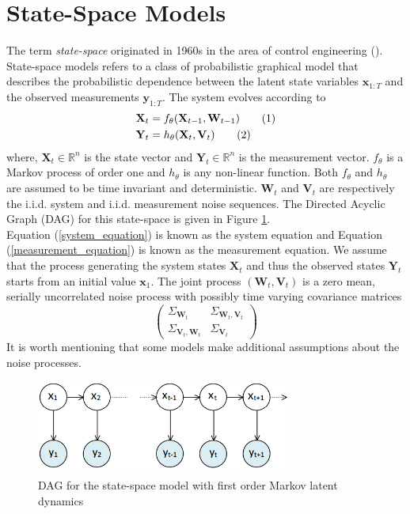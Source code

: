 \documentclass[11pt,a4,twosided,singlespacing,titlepagenumber=on]{scrreprt}
\numberwithin{equation}{chapter} %
\theoremstyle{remark}
\newcommand{\matr}[1]{\mathbf{#1}}
\newcommand\numberthis{\addtocounter{equation}{1}\tag{\theequation}}
\begin{document}
\section{State-Space Models}
\label{section:ssm}
The term \textit{state-space} originated in 1960s in the area of control engineering (\cite{kalman1960}). State-space models refers to a class of probabilistic graphical model that describes the probabilistic dependence between the latent state variables $\matr{x}_{1:T}$ and the observed measurements $\matr{y}_{1:T}$. The system evolves according to
\begin{align*}
\matr{X}_t &= f_\theta(\matr{X}_{t-1},\matr{W}_{t-1}) \numberthis \label{system_equation} \\
\matr{Y}_t &= h_\theta(\matr{X}_t, \matr{V}_t) \numberthis \label{measurement_equation}
\end{align*}
where, $\matr{X}_t \in \mathbb{R}^n$ is the state vector and $\matr{Y}_t \in \mathbb{R}^n$ is the measurement vector. $f_\theta$ is a Markov process of order one and $h_\theta$ is any non-linear function. Both $f_\theta$ and $h_\theta$ are assumed to be time invariant and deterministic. $\matr{W}_t$ and $\matr{V}_t$ are respectively the i.i.d. system and i.i.d. measurement noise sequences. The Directed Acyclic Graph (DAG) for this state-space is given in Figure \ref{state_space_models}. \\

Equation (\ref{system_equation}) is known as the system equation and Equation (\ref{measurement_equation}) is known as the measurement equation.  We assume that the process generating the system states $\matr{X}_t$ and thus the observed states $\matr{Y}_t$ starts from an initial value $\matr{x}_1$. The joint process $(\matr{W}_t, \matr{V}_t)$ is a zero mean, serially uncorrelated noise process with possibly time varying covariance matrices
\begin{equation}
\begin{pmatrix}
\Sigma_{\matr{W}_t} & \Sigma_{\matr{W}_t, \matr{V}_t}\\
\Sigma_{\matr{V}_t, \matr{W}_t} & \Sigma_{\matr{V}_t} \label{corr_ssm}
\end{pmatrix}
\end{equation}
It is worth mentioning that some models make additional assumptions about the noise processes.
\begin{figure}[H]
\centering
\includegraphics[width = 0.75\textwidth]{state_space_models}
\caption{DAG for the state-space model with first order Markov latent dynamics}
\label{state_space_models}
\end{figure}
\end{document}
